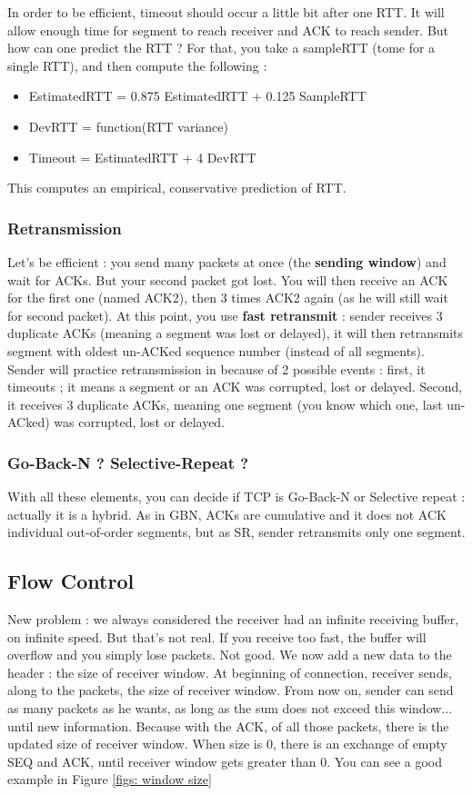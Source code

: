 \documentclass[12pt,a4paper]{article}
\begin{document}
In order to be efficient, timeout should occur a little bit after one RTT. It will allow enough time for segment to reach receiver and ACK to reach sender. But how can one predict the RTT ? For that, you take a sampleRTT (tome for a single RTT), and then compute the following :
\begin{itemize}
	\item 	EstimatedRTT = 0.875 EstimatedRTT + 0.125 SampleRTT
	\item 	DevRTT = function(RTT variance)
	\item 	Timeout = EstimatedRTT + 4 DevRTT
\end{itemize}
This computes an empirical, conservative prediction of RTT.

\subsubsection{Retransmission}
Let's be efficient : you send many packets at once (the \textbf{sending window}) and wait for ACKs. But your second packet got lost. You will then receive an ACK for the first one (named ACK2), then 3 times ACK2 again (as he will still wait for second packet). At this point, you use \textbf{fast retransmit} : sender receives 3 duplicate ACKs (meaning a segment was lost or delayed), it will then retransmits segment with oldest un-ACKed sequence number (instead of all segments). Sender will practice retransmission in because of 2 possible events : first, it timeouts ; it means a segment or an ACK was corrupted, lost or delayed. Second, it receives 3 duplicate ACKs, meaning one segment (you know which one, last un-ACked) was corrupted, lost or delayed.

\subsubsection[GBN/SR]{Go-Back-N ? Selective-Repeat ?}
With all these elements, you can decide if TCP is Go-Back-N or Selective repeat : actually it is a hybrid. As in GBN, ACKs are cumulative and it does not ACK individual out-of-order segments, but as SR, sender retransmits only one segment.

\subsection{Flow Control}
New problem : we always considered the receiver had an infinite receiving buffer, on infinite speed. But that's not real. If you receive too fast, the buffer will overflow and you simply lose packets. Not good. We now add a new data to the header : the size of receiver window. At beginning of connection, receiver sends, along to the packets, the size of receiver window. From now on, sender can send as many packets as he wants, as long as the sum does not exceed this window... until new information. Because with the ACK, of all those packets, there is the updated size of receiver window. When size is 0, there is an exchange of empty SEQ and ACK, until receiver window gets greater than 0. You can see a good example in Figure \ref{figs: window size}
\end{document}
